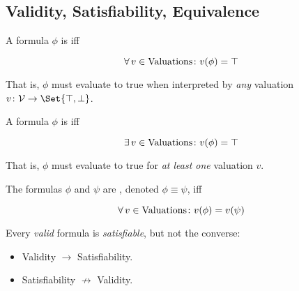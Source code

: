 \subsection{Validity, Satisfiability, Equivalence}

\begin{definition}[Valid]
    A formula $\phi$ is  iff
    
    \begin{equation}
        \operatorname{\forall} v \in \text{Valuations} \colon v(\phi) = \top
    \end{equation}
    
    That is, $\phi$ must evaluate to true when interpreted by \textit{any} 
    valuation $v \colon \mathcal{V} \to \Set{\top, \bot}$.
\end{definition}

\begin{definition}[Satisfiable]
    A formula $\phi$ is  iff
    
    \begin{equation}
        \operatorname{\exists} v \in \text{Valuations} \colon v(\phi) = \top
    \end{equation}
    
    That is, $\phi$ must evaluate to true for \textit{at least one} valuation 
    $v$.
\end{definition}

\begin{definition}[Equivalent]
    The formulas $\phi$ and $\psi$ are , denoted 
    $\phi \equiv \psi$, iff
    
    \begin{equation}
        \operatorname{\forall} v \in \text{Valuations} \colon v(\phi) = v(\psi)
    \end{equation}
\end{definition}

\begin{remark}
    Every \textit{valid} formula is \textit{satisfiable}, but not the converse:
    
    \begin{itemize}
        \item Validity $\to$ Satisfiability.
        \item Satisfiability $\not\to$ Validity.
    \end{itemize}
\end{remark}
